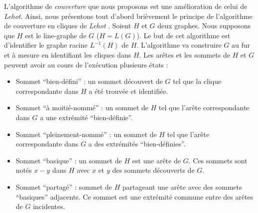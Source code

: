 L'algorithme de {\em couverture} que nous proposons est une am\'elioration de celui de {\em Lehot}.
Ainsi, nous pr\'esentons tout d'abord bri\`evement le principe de l'algorithme de couverture en cliques de {\em Lehot} \cite{decompositionEnCliquesParArcs}. 
\newline
Soient $H$ et $G$ deux graphes. Nous supposons que $H$ est le line-graphe de $G$ ($H=L(G)$).
Le but de cet algorithme est d'identifier le graphe racine $L^{-1}(H)$ de $H$.
L'algorithme va construire $G$  au fur et \`a mesure en identifiant les cliques dans $H$. 
Les ar\^etes et les sommets de $H$ et $G$ peuvent avoir au cours de l'ex\'ecution plusieurs \'etats :
\begin{itemize}
	\item Sommet ``bien-d\'efini'' : un sommet d\'ecouvert de $G$ tel que la clique correspondante dans $H$ a \'et\'e trouv\'ee et identifi\'ee.
	\item Sommet ``\`a moiti\'e-nomm\'e'' :  un sommet de $H$ tel que  l'ar\^ete correspondante dans $G$ a une extr\'emit\'e  ``bien-d\'efinie''. 
	\item Sommet ``pleinement-nomm\'e'' : un sommet de $H$ tel que l'ar\^ete correspondante dans $G$  a des extr\'emit\'es ``bien-d\'efinies''.
	\item Sommet ``basique'' : un sommet de $H$ est une ar\^ete de $G$. Ces sommets sont not\'es $x-y$ dans $H$ avec $x$ et $y$ des sommets d\'ecouverts de $G$.
	\item Sommet ``partag\'e'' : sommet de $H$ partageant une ar\^ete avec des sommets ``basiques'' adjacents. Ce sommet est une extr\'emit\'e commune entre des ar\^etes de $G$ incidentes. 
\end{itemize}



